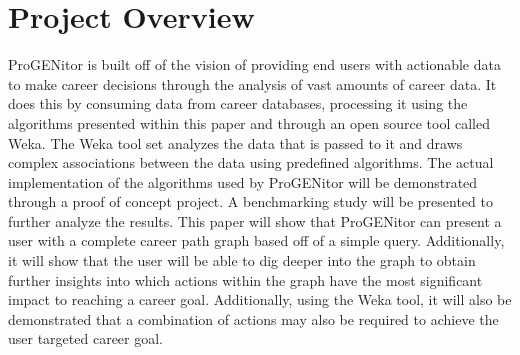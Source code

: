\section{Project Overview}
\label{sect:project-overview}
ProGENitor is built off of the vision of providing end users with actionable
data to make career decisions through the analysis of vast amounts of career
data.  It does this by consuming data from career databases, processing it using
the algorithms presented within this paper and through an open source tool called
Weka.  The Weka tool set analyzes the data that is passed to it and draws
complex associations between the data using predefined algorithms.  The actual
implementation of the algorithms used by ProGENitor will be demonstrated through
a proof of concept project.  A benchmarking study will be presented to
further analyze the results.  This paper will show that ProGENitor can present a user with a
complete career path graph based off of a simple query.  Additionally, it
will show that the user will be able to dig deeper into the graph to obtain
further insights into which actions within the graph have the most significant
impact to reaching a career goal.  Additionally, using the Weka tool, it will
also be demonstrated that a combination of actions may also be required to
achieve the user targeted career goal.
